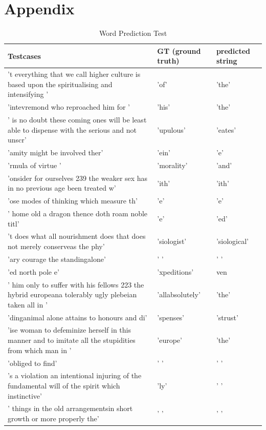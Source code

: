 \documentclass[11pt,a4paper,bibliography=totocnumbered,listof=totocnumbered]{scrartcl}
\begin{document}
\pagebreak
\section{Appendix}
\begin{table}[H]
\tiny
\centering
\caption{Word Prediction Test}
\begin{tabularx}{\textwidth}{X|X|X}

Testcases & GT (ground truth) & predicted string\\
\toprule
't everything that we call higher culture is based upon the spiritualising and intensifying ' & 'of' & 'the' \\ 
\hline 
'intevremond who reproached him for ' & 'his' & 'the' \\ 
\hline 
' is no doubt these coming ones will be least able to dispense with the serious and not unscr' & 'upulous' & 'eates' \\ 
\hline 
'amity might be involved ther' & 'ein' & 'e' \\ 
\hline 
'rmula of virtue ' & 'morality' & 'and' \\ 
\hline 
'onsider for ourselves  239 the weaker sex has in no previous age been treated w' & 'ith' & 'ith' \\ 
\hline 
'ose modes of thinking which measure th' & 'e' & 'e' \\ 
\hline 
' home old a dragon thence doth roam  noble titl' & 'e' & 'ed' \\ 
\hline 
't does what all nourishment does that does not merely conserveas the phy' & 'siologist' & 'siological' \\ 
\hline 
'ary courage the standingalone' & ' ' & ' ' \\ 
\hline 
'ed north pole e' & 'xpeditions' & ven \\ 
\hline 
' him only to suffer with his fellows  223 the hybrid europeana tolerably ugly plebeian taken all in ' & 'allabsolutely' & 'the' \\ 
\hline 
'dinganimal alone attains to honours and di' & 'spenses' & 'strust' \\ 
\hline 
'ise woman to defeminize herself in this manner and to imitate all the stupidities from which man in ' & 'europe' & 'the' \\ 
\hline 
'obliged to find' & ' ' & ' ' \\ 
\hline 
's a violation an intentional injuring of the fundamental will of the spirit which instinctive' & 'ly' & ' ' \\ 
\hline 
' things in the old arrangementsin short growth or more properly the' & ' ' & ' ' \\ 

\end{tabularx}
\end{table}
\end{document}
